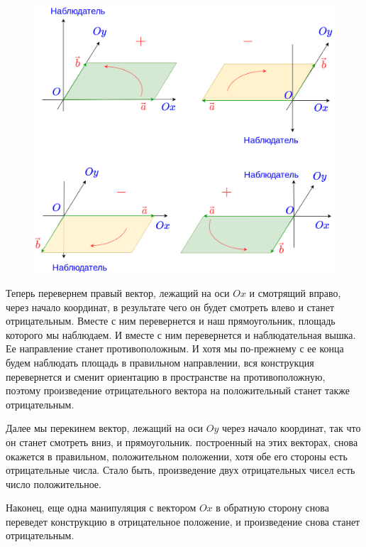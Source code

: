 \begin{enumerate}
\begin{figure}[hbt!]
\begin{center}
\includegraphics[scale=0.2]{mult.png}
\end{center}
\caption{}\label{mult}
\end{figure}

Теперь перевернем правый вектор, лежащий на оси $Ox$ и смотрящий вправо, через начало координат, в результате чего он будет смотреть влево и станет отрицательным. Вместе с ним перевернется и наш прямоугольник, площадь которого мы наблюдаем. И вместе с ним перевернется и наблюдательная вышка. Ее направление станет противоположным. И хотя мы по-прежнему с ее конца будем наблюдать площадь в правильном направлении, вся конструкция перевернется и сменит ориентацию в пространстве на противоположную, поэтому произведение отрицательного вектора на положительный станет также отрицательным.

Далее мы перекинем вектор, лежащий на оси $Oy$ через начало координат, так что он станет смотреть вниз, и прямоугольник. построенный на этих векторах, снова окажется в правильном, положительном положении, хотя обе его стороны есть отрицательные числа. Стало быть, произведение двух отрицательных чисел есть число положительное.

Наконец, еще одна манипуляция с вектором $Ox$ в обратную сторону снова переведет конструкцию в отрицательное положение, и произведение снова станет отрицательным.


\end{enumerate}
